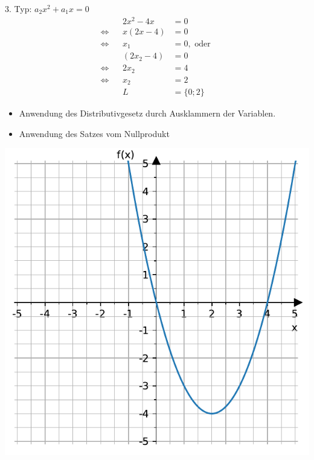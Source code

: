 \documentclass[
  ignorenonframetext,
  aspectratio=169,
]{beamer}
\providecommand{\tightlist}{%
  \setlength{\itemsep}{0pt}\setlength{\parskip}{0pt}}\usepackage{longtable,booktabs,array}
\begin{document}
\begin{frame}
\begin{block}{3. Typ: \(a_2 x^2+ a_1 x=0\)}
\label{typ-a_2-x2-a_1-x0}
\[ \begin{aligned}
&& 2x^2-4x &= 0\\
\Leftrightarrow && x(2x-4) &= 0\\
\Leftrightarrow && x_1 &= 0, \text{ oder }\\
&& (2x_2-4)&= 0\\
\Leftrightarrow && 2x_2 &= 4\\
\Leftrightarrow && x_2 &= 2\\
&& L &= \{0; 2\}
\end{aligned}
\]

\begin{itemize}
\tightlist
\item
  Anwendung des Distributivgesetz durch Ausklammern der Variablen.
\item
  Anwendung des Satzes vom Nullprodukt
\end{itemize}
\end{block}
\end{frame}

\begin{frame}
\includegraphics{3_Gleichungen_files/figure-beamer/cell-4-output-1.pdf}
\end{frame}
\end{document}
